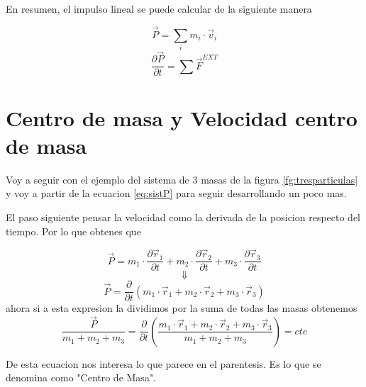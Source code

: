 \documentclass[../Main.tex]{subfiles}
\begin{document}
\begin{minipage}[t]{0.6\textwidth}
En resumen, el impulso lineal se puede calcular de la siguiente manera

\begin{equation*}
    \vec{P} = \sum _i m_i \cdot \vec{v} _i
\end{equation*}
\begin{equation*}
    \frac{\partial \vec{P}}{\partial t} = \sum \vec{F}^{EXT}
\end{equation*}

\end{minipage}
\newpage
\begin{minipage}[t]{0.3\textwidth}
\end{minipage}
\hfill
\begin{minipage}[t]{0.6\textwidth}

\section{Centro de masa y Velocidad centro de masa}

Voy a seguir con el ejemplo del sistema de 3 masas de la figura \ref{fg:tresparticulas}
y voy a partir de la ecuacion \ref{eq:sistP} para seguir desarrollando un poco mas.

El paso siguiente pensar la velocidad como la derivada de la posicion respecto
del tiempo. Por lo que obtenes que 

\begin{equation*}
    \vec{P} = m_1 \cdot \frac{\partial \vec{r} _1}{\partial t} + m_2 \cdot \frac{\partial \vec{r} _2}{\partial t} + m_3 \cdot \frac{\partial \vec{r} _3}{\partial t}
\end{equation*}
\begin{equation*}
    \Downarrow
\end{equation*}
\begin{equation*}
    \vec{P} = \frac{\partial}{\partial t}(m_1 \cdot \vec{r} _1 + m_2 \cdot \vec{r} _2 + m_3 \cdot \vec{r} _3)
\end{equation*}
ahora si a esta expresion la dividimos por la suma de todas las masas obtenemos
\begin{equation}
    \frac{\vec{P}}{m_1 + m_2 + m_3} = \frac{\partial}{\partial t} \left(\frac{m_1 \cdot \vec{r} _1 + m_2 \cdot \vec{r} _2 + m_3 \cdot \vec{r} _3}{m_1 + m_2 + m_3} \right) = cte
    \label{eq:preRC}
\end{equation}

De esta ecuacion nos interesa lo que parece en el parentesis. Es lo que se
denomina como "Centro de Masa". 


\end{minipage}
\end{document}
